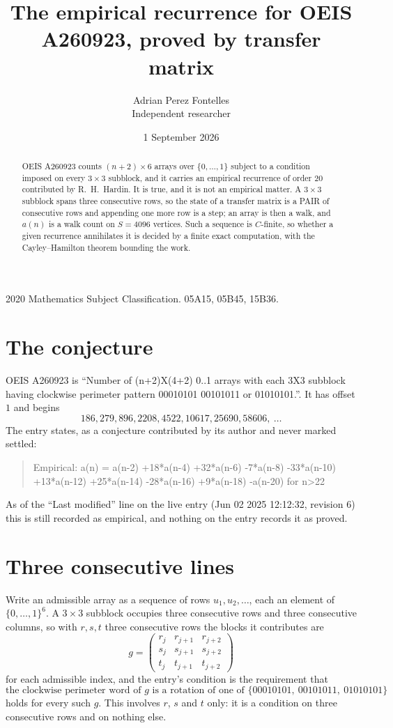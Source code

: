 \documentclass[11pt,a4paper]{article}
\title{The empirical recurrence for OEIS A260923, proved by transfer matrix}
\author{Adrian Perez Fontelles\\ \small Independent researcher}
\date{1 September 2026}
\theoremstyle{plain}
\theoremstyle{definition}
\begin{document}
\maketitle

\begin{abstract}
OEIS A260923 counts $(n+2)\times6$ arrays over $\{0,\dots,1\}$ subject to a condition imposed on
every $3\times3$ subblock, and it carries an empirical recurrence of order $20$
contributed by R.~H.~Hardin. It is true, and it is not an empirical matter. A $3\times3$
subblock spans three consecutive rows, so the state of a transfer matrix is a PAIR of
consecutive rows and appending one more row is a step; an array is then a walk, and
$a(n)$ is a walk count on $S=4096$ vertices. Such a sequence is $C$-finite, so whether a given
recurrence annihilates it is decided by a finite exact computation, with the Cayley--Hamilton
theorem bounding the work.
\end{abstract}

\noindent\small 2020 Mathematics Subject Classification. 05A15, 05B45, 15B36.\normalsize

\section{The conjecture}

OEIS A260923 is ``Number of (n+2)X(4+2) 0..1 arrays with each 3X3 subblock having clockwise perimeter pattern 00010101 00101011 or 01010101.''. It has offset $1$ and begins
\[
186, 279, 896, 2208, 4522, 10617, 25690, 58606,\ \dots
\]
The entry states, as a conjecture contributed by its author and never marked settled:
\begin{quote}
Empirical: a(n) = a(n-2) +18*a(n-4) +32*a(n-6) -7*a(n-8) -33*a(n-10) +13*a(n-12) +25*a(n-14) -28*a(n-16) +9*a(n-18) -a(n-20) for n>22
\end{quote}
As of the ``Last modified'' line on the live entry (Jun 02 2025 12:12:32, revision 6) this is still
recorded as empirical, and nothing on the entry records it as proved.

\section{Three consecutive lines}

Write an admissible array as a sequence of rows $u_1,u_2,\dots$, each an element of
$\{0,\dots,1\}^{6}$. A $3\times3$ subblock occupies three consecutive rows and
three consecutive columns, so with $r,s,t$ three consecutive rows the blocks it
contributes are
\[
g=\begin{pmatrix}r_j&r_{j+1}&r_{j+2}\\ s_j&s_{j+1}&s_{j+2}\\ t_j&t_{j+1}&t_{j+2}\end{pmatrix}
\]
for each admissible index, and the entry's condition is the requirement that
\[
\text{the clockwise perimeter word of }g\text{ is a rotation of one of }\{00010101,\ 00101011,\ 01010101\}
\]
holds for every such $g$. This involves $r$, $s$ and $t$ only: it is a condition on
three consecutive rows and on nothing else.
\end{document}
